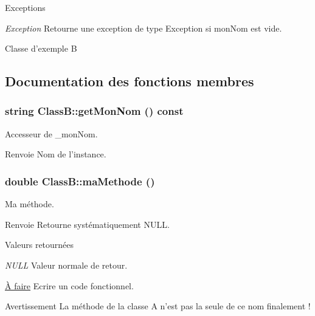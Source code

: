 \begin{DoxyExceptions}{Exceptions}
\item[{\em Exception}]Retourne une exception de type Exception si monNom est vide.\end{DoxyExceptions}
Classe d'exemple B 

\subsection{Documentation des fonctions membres}
\hypertarget{class_class_b_a52a89bf5f66d82ae413610aea58363ca}{
\subsubsection[{getMonNom}]{\setlength{\rightskip}{0pt plus 5cm}string ClassB::getMonNom () const}}
\label{class_class_b_a52a89bf5f66d82ae413610aea58363ca}


Accesseur de \_\-monNom. \begin{DoxyReturn}{Renvoie}
Nom de l'instance. 
\end{DoxyReturn}
\hypertarget{class_class_b_ac17b7f1214a74505d7882ebf9ddcb65e}{
\subsubsection[{maMethode}]{\setlength{\rightskip}{0pt plus 5cm}double ClassB::maMethode ()}}
\label{class_class_b_ac17b7f1214a74505d7882ebf9ddcb65e}


Ma méthode. \begin{DoxyReturn}{Renvoie}
Retourne systématiquement NULL. 
\end{DoxyReturn}

\begin{DoxyRetVals}{Valeurs retournées}
\item[{\em NULL}]Valeur normale de retour.\end{DoxyRetVals}
\begin{Desc}
\item[\hyperlink{todo__todo000001}{À faire}]Ecrire un code fonctionnel. \end{Desc}
\begin{DoxyWarning}{Avertissement}
La méthode de la classe A n'est pas la seule de ce nom finalement !
\end{DoxyWarning}

